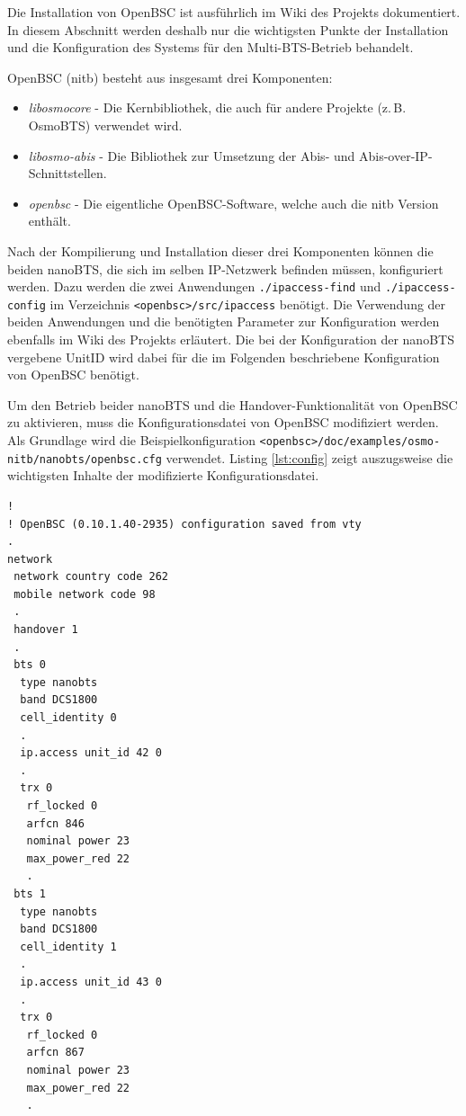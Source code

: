 Die Installation von OpenBSC ist ausführlich im Wiki des Projekts \cite{bib:buildopenbsc} dokumentiert. In diesem Abschnitt werden deshalb nur die wichtigsten Punkte der Installation und die Konfiguration des Systems für den Multi-BTS-Betrieb behandelt.

OpenBSC (nitb) besteht aus insgesamt drei Komponenten:

\begin{itemize}
 \item \textit{libosmocore} - Die Kernbibliothek, die auch für andere Projekte (z.\,B. OsmoBTS) verwendet wird.
 \item \textit{libosmo-abis} - Die Bibliothek zur Umsetzung der Abis- und Abis-over-IP-Schnittstellen.
 \item \textit{openbsc} - Die eigentliche OpenBSC-Software, welche auch die nitb Version enthält.
\end{itemize}

Nach der Kompilierung und Installation dieser drei Komponenten können die beiden nanoBTS, die sich im selben IP-Netzwerk befinden müssen, konfiguriert werden. Dazu werden die zwei Anwendungen \lstinline{./ipaccess-find} und \lstinline{./ipaccess-config} im Verzeichnis \lstinline{<openbsc>/src/ipaccess} benötigt. Die Verwendung der beiden Anwendungen und die benötigten Parameter zur Konfiguration werden ebenfalls im Wiki des Projekts \cite{bib:ipaccess} erläutert. Die bei der Konfiguration der nanoBTS vergebene UnitID wird dabei für die im Folgenden beschriebene Konfiguration von OpenBSC benötigt.

Um den Betrieb beider nanoBTS und die Handover-Funktionalität von OpenBSC zu aktivieren, muss die Konfigurationsdatei von OpenBSC modifiziert werden. Als Grundlage wird die Beispielkonfiguration \lstinline{<openbsc>/doc/examples/osmo-nitb/nanobts/openbsc.cfg} verwendet. Listing \ref{lst:config} zeigt auszugsweise die wichtigsten Inhalte der modifizierte Konfigurationsdatei.

\begin{lstlisting}[label=lst:config,caption=OpenBSC Konfigurationsdatei (Auszug)]
!
! OpenBSC (0.10.1.40-2935) configuration saved from vty
.
network
 network country code 262
 mobile network code 98
 .
 handover 1
 .
 bts 0
  type nanobts
  band DCS1800
  cell_identity 0
  .
  ip.access unit_id 42 0
  .
  trx 0
   rf_locked 0
   arfcn 846
   nominal power 23
   max_power_red 22
   .
 bts 1
  type nanobts
  band DCS1800
  cell_identity 1
  .
  ip.access unit_id 43 0
  .
  trx 0
   rf_locked 0
   arfcn 867
   nominal power 23
   max_power_red 22
   .
\end{lstlisting}

